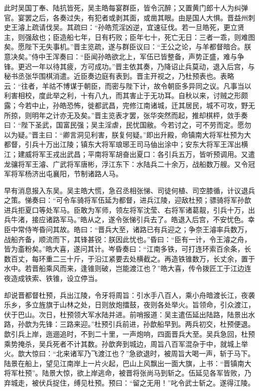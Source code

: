 此时吴国丁奉、陆抗皆死，吴主皓每宴群臣，皆令沉醉；又置黄门郎十人为纠弹官。宴罢之后，各奏过失，有犯者或剥其面，或凿其眼。由是国人大惧。晋益州刺史王濬上疏请伐吴。其疏曰：“孙皓荒淫凶逆，宜速征伐。若一旦皓死，更立贤主，则强敌也；臣造船七年，日有朽败；臣年七十，死亡无日：三者一乖，则难图矣。愿陛下无失事机。”晋主览疏，遂与群臣议曰：“王公之论，与羊都督暗合。朕意决矣。”侍中王浑奏曰：“臣闻孙皓欲北上，军伍已皆整备，声势正盛，难与争锋。更迟一年以待其疲，方可成功。”晋主依其奏，乃降诏止兵莫动，退入后宫，与秘书丞张华围棋消遣。近臣奏边庭有表到。晋主开视之，乃杜预表也。表略云：“往者，羊祜不博谋于朝臣，而密与陛下计，故令朝臣多异同之议。凡事当以利害相校，度此举之利，十有八九，而其害止于无功耳。自秋以来，讨贼之形颇露；今若中止，孙皓恐怖，徙都武昌，完修江南诸城，迁其居民，城不可攻，野无所掠，则明年之计亦无及矣。”晋主览表才罢，张华突然而起，推却棋枰，敛手奏曰：“陛下圣武，国富民强；吴主淫虐，民忧国敝。今若讨之，可不劳而定。愿勿以为疑。”晋主曰：“卿言洞见利害，朕复何疑。”即出升殿，命镇南大将军杜预为大都督，引兵十万出江陵；镇东大将军琅琊王司马伷出涂中；安东大将军王浑出横江；建威将军王戎出武昌；平南将军胡奋出夏口：各引兵五万，皆听预调用。又遣龙骧将军王濬、广武将军唐彬，浮江东下：水陆兵二十余万，战船数万艘。又令冠军将军杨济出屯襄阳，节制诸路人马。

早有消息报入东吴。吴主皓大慌，急召丞相张悌、司徒何植、司空膝循，计议退兵之策。悌奏曰：“可令车骑将军伍延为都督，进兵江陵，迎敌杜预；骠骑将军孙歆进兵拒夏口等处军马。臣敢为军师，领左将军沈莹、右将军诸葛靓，引兵十万，出兵牛渚，接应诸路军马。”皓从之，遂令张悌引兵去了。皓退入后宫，不安忧色。幸臣中常侍岑昏问其故。皓曰：“晋兵大至，诸路已有兵迎之；争奈王濬率兵数万，战船齐备，顺流而下，其锋甚锐：朕因此忧也。”昏曰：“臣有一计，令王濬之舟，皆为齑粉矣。”皓大喜，遂问其计。岑昏奏曰：“江南多铁，可打连环索百余条，长数百丈，每环重二三十斤，于沿江紧要去处横截之。再造铁锥数万，长丈余，置于水中。若晋船乘风而来，逢锥则破，岂能渡江也？”皓大喜，传令拨匠工于江边连夜造成铁索、铁锥，设立停当。

却说晋都督杜预，兵出江陵，令牙将周旨：引水手八百人，乘小舟暗渡长江，夜袭乐乡，多立旌旗于山林之处，日则放炮擂鼓，夜则各处举火。旨领命，引众渡江，伏于巴山。次日，杜预领大军水陆并进。前哨报道：吴主遣伍延出陆路，陆景出水路，孙歆为先锋：三路来迎。”杜预引兵前进，孙歆船早到。两兵初交，杜预便退。歆引兵上岸，迤逦追时，不到二十里，一声炮响，四面晋兵大至。吴兵急回，杜预乘势掩杀，吴兵死者不计其数。孙歆奔到城边，周旨八百军混杂于中，就城上举火。歆大惊曰：“北来诸军乃飞渡江也？”急欲退时，被周旨大喝一声，斩于马下。陆景在船上，望见江南岸上一片火起，巴山上风飘出一面大旗，上书：“晋镇南大将军杜预”。陆景大惊，欲上岸逃命，被晋将张尚马到斩之。伍延见各军皆败，乃弃城走，被伏兵捉住，缚见杜预。预曰：“留之无用！”叱令武士斩之。遂得江陵。

